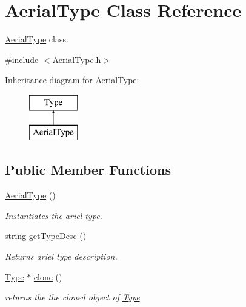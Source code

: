 \hypertarget{classAerialType}{}\section{Aerial\+Type Class Reference}
\label{classAerialType}


\hyperlink{classAerialType}{Aerial\+Type} class.  




{\ttfamily \#include $<$Aerial\+Type.\+h$>$}

Inheritance diagram for Aerial\+Type\+:\begin{figure}[H]
\begin{center}
\leavevmode
\includegraphics[height=2.000000cm]{classAerialType}
\end{center}
\end{figure}
\subsection*{Public Member Functions}
\begin{DoxyCompactItemize}
\item 
\mbox{\label{classAerialType_af31f880cd2a2437544e77d38f60d1c99}} 
\hyperlink{classAerialType_af31f880cd2a2437544e77d38f60d1c99}{Aerial\+Type} ()
\begin{DoxyCompactList}\small\item\em Instantiates the ariel type. \end{DoxyCompactList}\item 
string \hyperlink{classAerialType_a66dd43f2688de9a5eab9c6de0396e9cc}{get\+Type\+Desc} ()
\begin{DoxyCompactList}\small\item\em Returns ariel type description. \end{DoxyCompactList}\item 
\hyperlink{classType}{Type} $\ast$ \hyperlink{classAerialType_a8e7184b0b9e184142144df65f3da7fb1}{clone} ()
\begin{DoxyCompactList}\small\item\em returns the the cloned object of \hyperlink{classType}{Type} \end{DoxyCompactList}\end{DoxyCompactItemize}


